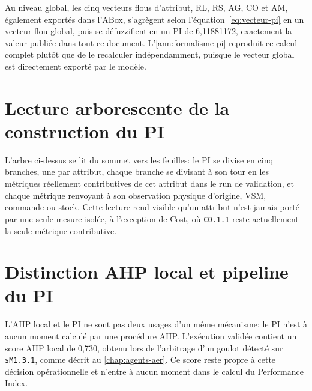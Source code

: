Au niveau global, les cinq vecteurs flous d'attribut, RL, RS, AG, CO et AM, également exportés dans l'ABox, s'agrègent selon l'équation~\ref{eq:vecteur-pi} en un vecteur flou global, puis se défuzzifient en un PI de 6,11881172, exactement la valeur publiée dans tout ce document. L'\cref{ann:formalisme-pi} reproduit ce calcul complet plutôt que de le recalculer indépendamment, puisque le vecteur global est directement exporté par le modèle.

\section{Lecture arborescente de la construction du PI}


L'arbre ci-dessus se lit du sommet vers les feuilles: le PI se divise en cinq branches, une par attribut, chaque branche se divisant à son tour en les métriques réellement contributives de cet attribut dans le run de validation, et chaque métrique renvoyant à son observation physique d'origine, VSM, commande ou stock. Cette lecture rend visible qu'un attribut n'est jamais porté par une seule mesure isolée, à l'exception de Cost, où \texttt{CO.1.1} reste actuellement la seule métrique contributive.

\section{Distinction AHP local et pipeline du PI}


L'AHP local et le PI ne sont pas deux usages d'un même mécanisme: le PI n'est à aucun moment calculé par une procédure AHP. L'exécution validée contient un score AHP local de 0,730, obtenu lors de l'arbitrage d'un goulot détecté sur \texttt{sM1.3.1}, comme décrit au \cref{chap:agents-aer}. Ce score reste propre à cette décision opérationnelle et n'entre à aucun moment dans le calcul du Performance Index.


